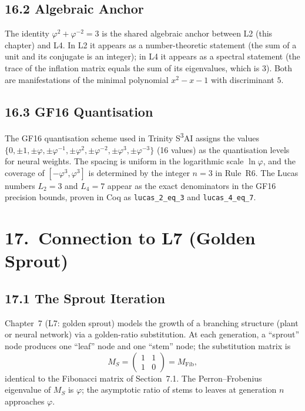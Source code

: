 \subsection{16.2 Algebraic Anchor}
\label{subsec:gc-l4-anchor}

The identity $\varphi^2 + \varphi^{-2} = 3$ is the
shared algebraic anchor between L2 (this chapter)
and L4.
In L2 it appears as a number-theoretic statement
(the sum of a unit and its conjugate is an integer);
in L4 it appears as a spectral statement (the
trace of the inflation matrix equals the sum of
its eigenvalues, which is $3$).
Both are manifestations of the minimal polynomial
$x^2 - x - 1$ with discriminant $5$.

\subsection{16.3 GF16 Quantisation}
\label{subsec:gc-gf16}

The GF16 quantisation scheme used in Trinity
S\textsuperscript{3}AI assigns the values
$\{0, \pm 1, \pm \varphi, \pm \varphi^{-1},
   \pm \varphi^2, \pm \varphi^{-2}, \pm \varphi^3,
   \pm \varphi^{-3}\}$ (16 values) as the quantisation
levels for neural weights.
The spacing is uniform in the logarithmic scale
$\ln\varphi$, and the coverage of $[-\varphi^3, \varphi^3]$
is determined by the integer $n=3$ in Rule~R6.
The Lucas numbers $L_2 = 3$ and $L_4 = 7$ appear as
the exact denominators in the GF16 precision bounds,
proven in Coq as \texttt{lucas\_2\_eq\_3} and
\texttt{lucas\_4\_eq\_7}.

\section{17.\ Connection to L7 (Golden Sprout)}
\label{sec:gc-l7-link}

\subsection{17.1 The Sprout Iteration}
\label{subsec:gc-l7-sprout}

Chapter~7 (L7: golden sprout) models the growth of
a branching structure (plant or neural network) via
a golden-ratio substitution.
At each generation, a ``sprout'' node produces one
``leaf'' node and one ``stem'' node; the substitution
matrix is
\[
  M_S = \begin{pmatrix} 1 & 1 \\ 1 & 0 \end{pmatrix}
  = M_{\mathrm{Fib}},
\]
identical to the Fibonacci matrix of Section~7.1.
The Perron--Frobenius eigenvalue of $M_S$ is $\varphi$;
the asymptotic ratio of stems to leaves at generation
$n$ approaches $\varphi$.

